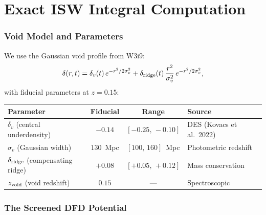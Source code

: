 \documentclass[11pt,a4paper]{article}
\begin{document}
\part{Exact ISW Integral Computation}
\label{part:ISW}


\section{Void Model and Parameters}
\label{sec:void-model}

We use the Gaussian void profile from W3i9:
\begin{equation}
\delta(r,t) = \delta_v(t)\,e^{-r^2/2\sigma_v^2}
+ \delta_{\rm ridge}(t)\,\frac{r^2}{\sigma_v^2}\,e^{-r^2/2\sigma_v^2},
\label{eq:void-profile}
\end{equation}
with fiducial parameters at $z = 0.15$:
\begin{center}
\begin{tabular}{lccl}
\toprule
\textbf{Parameter} & \textbf{Fiducial} & \textbf{Range} & \textbf{Source} \\
\midrule
$\delta_v$ (central underdensity) & $-0.14$ & $[-0.25,\,-0.10]$ &
  DES (Kovacs et al.\ 2022) \\
$\sigma_v$ (Gaussian width) & $130$~Mpc & $[100,\,160]$~Mpc &
  Photometric redshift \\
$\delta_{\rm ridge}$ (compensating ridge) & $+0.08$ & $[+0.05,\,+0.12]$ &
  Mass conservation \\
$z_{\rm void}$ (void redshift) & $0.15$ & --- & Spectroscopic \\
\bottomrule
\end{tabular}
\end{center}


\section{The Screened DFD Potential}
\label{sec:screened-potential}
\end{document}
